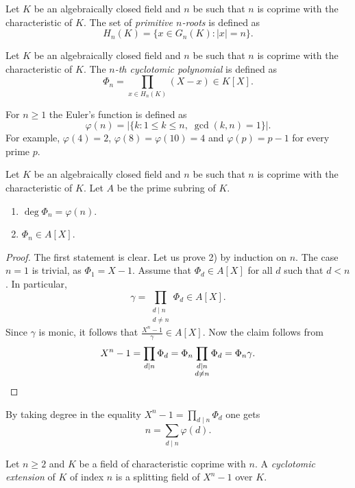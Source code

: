 Let $K$ be an algebraically closed field and $n$ be
such that $n$ is coprime with the characteristic of $K$. The set of 
\emph{primitive $n$-roots} is defined as 
\[
H_n(K)=\{x\in G_n(K):|x|=n\}.
\]

\begin{definition}
    Let $K$ be an algebraically closed field and $n$ be
    such that $n$ is coprime with the characteristic of $K$. The \emph{$n$-th cyclotomic
    polynomial} is defined as 
    \[
    \Phi_n=\prod_{x\in H_n(K)}(X-x)\in K[X].
    \]
\end{definition}

For $n\geq1$ the Euler's function is defined as 
\[
\varphi(n)=|\{k:1\leq k\leq n,\;\gcd(k,n)=1\}|.
\]
For example, $\varphi(4)=2$, $\varphi(8)=\varphi(10)=4$ and $\varphi(p)=p-1$ for every prime $p$. 

\begin{proposition}
    Let $K$ be an algebraically closed field and $n$ be
    such that $n$ is coprime with the characteristic of $K$. Let $A$ be
    the prime subring of $K$. 
    \begin{enumerate}
        \item $\deg\Phi_n=\varphi(n)$.
        \item $\Phi_n\in A[X]$.
    \end{enumerate}
\end{proposition}

\begin{proof}
    The first statement is clear. Let us prove 2) by induction on $n$. The case $n=1$ is
    trivial, as $\Phi_1=X-1$. Assume that $\Phi_d\in A[X]$ for all $d$ such that $d<n$. 
    In particular,
    \[
    \gamma=\prod_{\substack{d\mid n\\d\ne n}}\Phi_d\in A[X].
    \]
    Since $\gamma$ is monic, it follows that 
    $\frac{X^n-1}{\gamma}\in A[X]$. Now the claim follows from 
    \[
    X^n-1=\prod_{d\mid n}\Phi_d=\Phi_n\prod_{\substack{d\mid n\\d\ne n}}\Phi_d=\Phi_n\gamma.\qedhere
    \]
\end{proof}

By taking degree in the equality 
$X^n-1=\prod_{d\mid n}\Phi_d$ 
one gets 
\[
n=\sum_{d\mid n}\varphi(d).
\]

\begin{definition}
\label{defn:cyclotomic}
    Let $n\geq2$ and $K$ be a field of characteristic coprime with $n$. A 
    \emph{cyclotomic extension} of $K$ of index $n$ is a 
    splitting field of $X^n-1$ over $K$. 
\end{definition}

